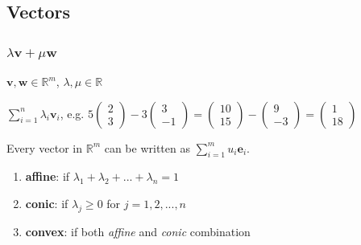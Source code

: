 
\subsection{Vectors}

\subsubsection{ $\lambda \mathbf{v} + \mu\mathbf{w}$}
$\mathbf{v},\mathbf{w} \in \mathbb{R}^m$, $\lambda, \mu \in \mathbb{R}$

$\sum^n_{i=1}\lambda_i\mathbf{v}_i$, e.g. $5\begin{pmatrix}2\\3\end{pmatrix} - 3\begin{pmatrix}3\\-1\end{pmatrix} =
\begin{pmatrix}10\\15\end{pmatrix} - \begin{pmatrix}9\\-3\end{pmatrix} =
\begin{pmatrix}1\\18\end{pmatrix}$

Every vector in $\mathbb{R}^m$ can be written as $\sum^m_{i=1} u_i\mathbf{e}_i$.

\begin{enumerate}[label=(\roman*)]
\item 
    \textbf{affine}: if $\lambda_1 + \lambda_2 + ... + \lambda_n = 1$
\item 
    \textbf{conic}: if $\lambda_j \geq 0$ for $j=1,2,...,n$
\item 
    \textbf{convex}: if both \textit{affine} and \textit{conic} combination
\end{enumerate}

